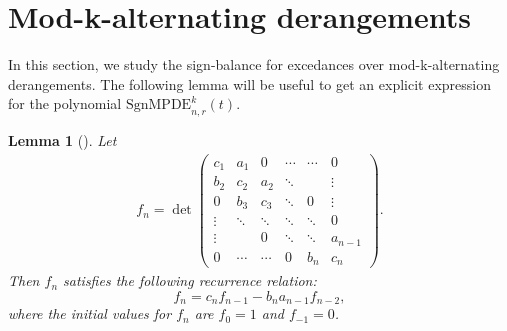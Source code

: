 \documentclass[12pt]{article}
\newcommand{\mpd}{\mathrm{mpd}}
\newcommand{\SMPDE}{\mathrm{SgnMPDE}}
\newcommand{\mpa}{\mathrm{mp}}
\newtheorem{lemma}{\bf Lemma}[section]
\begin{document}
\section{Mod-k-alternating derangements} 
\label{sec:mod-k-alt-derang}

 In this section, we study the sign-balance for excedances over mod-k-alternating derangements. 
The following lemma will be useful to get an explicit expression for the polynomial $\SMPDE_{n,r}^k(t)$. 

\begin{lemma}[{\cite[Theorem 2.1]{Mikkawy-det-tridiagonal}}]
\label{lem:det-tridisgonal}
Let
    \begin{align*}
      f_n=\det \left(
 	\begin{array}{cccccc}
 	c_1 & a_1 & 0 & \cdots & \cdots & 0 \\
 	b_2 & c_2 & a_2 & \ddots &   & \vdots \\
 	0 & b_3 & c_3 & \ddots &  0 & \vdots \\
 	\vdots & \ddots & \ddots & \ddots  & \ddots & 0 \\
        \vdots & & 0 & \ddots & \ddots & a_{n-1} \\
        0 & \cdots & \cdots & 0 & b_n & c_n
 	\end{array}
 	\right).  
    \end{align*}
Then $f_n$ satisfies the following recurrence relation:
$$f_n=c_nf_{n-1}-b_na_{n-1}f_{n-2},$$
where the initial values for $f_n$ are $f_0=1$ and $f_{-1}=0$.
\end{lemma}

 
\end{document}
